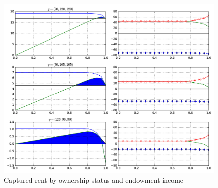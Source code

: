 \documentclass[11pt,english]{article}
\theoremstyle{plain}
\theoremstyle{definition}
\begin{document}
\begin{figure}
\includegraphics[]{fig_nonprofits.pdf}
\caption{\label{fig:nonprofit}Captured rent by ownership status and endowment
income}
\end{figure}
\end{document}
